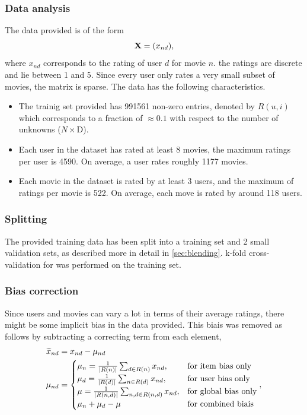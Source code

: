 \subsubsection{Data analysis}

The data provided is of the form 
\begin{equation}
  \mathbf{X} = (x_{nd}),
\end{equation}
where $x_{nd}$ corresponds to the rating of user $d$ for movie $n$.  
the ratings are discrete and lie between 1 and 5. Since every user only rates a
very small subset of movies, the matrix is sparse. The data has the following
characteristics.

\begin{itemize}
  \item The trainig set provided has 991561 non-zero entries, denoted by $R(u,i)$ which corresponds to 
a fraction of $\approx 0.1$ with respect to the number of unknowns ($N \times $D). 
  \item Each user in the dataset has rated at least 8 movies, the maximum
    ratings per user is 4590. On average, a user rates roughly 1177 movies.
  \item Each movie in the dataset is rated by at least 3 users, and the maximum
    of ratings per movie is 522. On average, each move is rated by around 118
    users. 
\end{itemize}

\subsubsection{Splitting}
\label{sec:splitting}

The provided training data has been split into a training set and 2 small 
validation sets, as described more in detail in \ref{sec:blending}. k-fold cross-validation for was performed on the training set.

\subsubsection{Bias correction}
\label{sec:biascorrection}

Since users and movies can vary a lot in terms of their average ratings, 
there might be some implicit bias in
the data provided. 
This biais was removed as follows by subtracting a correcting term from each
element,
\begin{align}
  \widetilde{x}_{nd} &= x_{nd}-\mu_{nd} \\
  \mu_{nd} &=
 \begin{cases}
  \mu_{n} = \inv{|R(n)|} \sum_{d \in R(n)} x_{nd}, &\text{for item bias only}   \\
\mu_{d} = \inv{|R(d)|} \sum_{n \in R(d)} x_{nd}, &\text{for user bias only} \\
\mu = \inv{|R(n,d)|}\sum_{n,d \in R(n,d)} x_{nd}, &\text{for global bias only}
   \\
  \mu_{n} + \mu_{d} - \mu &\text{for combined biais}
 \end{cases}, 
  \label{eq:biases}
\end{align}

